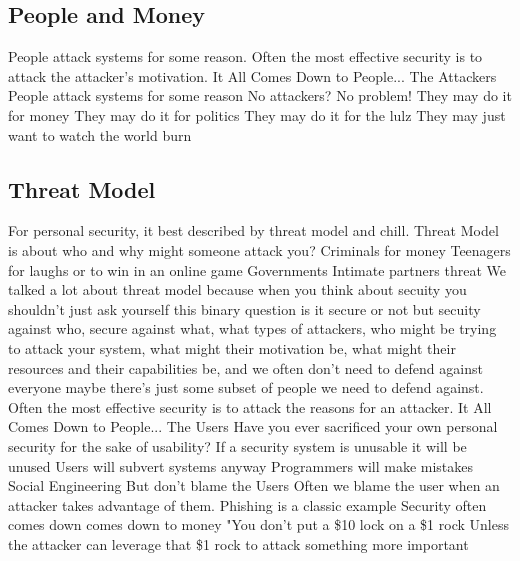 \documentclass[11 pt]{scrartcl}
\begin{document}
\subsection{People and Money}
People attack systems for some reason. Often the most effective security is to attack the attacker's motivation.\newline
It All Comes Down to People... \newline
The Attackers\newline
People attack systems for some reason\newline
No attackers? No problem!
\itemnum
    \ii They may do it for money
    \ii They may do it for politics
    \ii They may do it for the lulz
    \ii They may just want to watch the world burn
\itemend
\subsection{Threat Model}
For personal security, it best described by threat model and chill.\newline
Threat Model is about who and why might someone attack you? 
\itemnum
    \ii Criminals for money
    \ii Teenagers for laughs or to win in an online game
    \ii Governments
    \ii Intimate partners threat
\itemend
We talked a lot about threat model because when you think about secuity you shouldn't just ask yourself this binary question is it secure or not but secuity  against who, secure against what, what types of attackers, who might be
trying to attack your system, what might their motivation be, what might their
resources and their capabilities be, and we often don't need to defend against everyone maybe there's just some subset of people we need to defend against.
Often the most effective security is to attack the reasons for an attacker.\newline
It All Comes Down to People... \newline
The Users\newline
Have you ever sacrificed your own personal security for the sake of usability?
\itemnum
    \ii If a security system is unusable it will be unused
    \ii Users will subvert systems anyway
    \ii Programmers will make mistakes
    \ii Social Engineering
\itemend
But don't blame the Users
\itemnum
    \ii Often we blame the user when an attacker takes advantage of them.
    \ii Phishing is a classic example
\itemend
Security often comes down comes down to money 
\itemnum
    \ii "You don't put a \$10 lock on a \$1 rock Unless the attacker can leverage that \$1 rock to attack something more important
\end{document}
